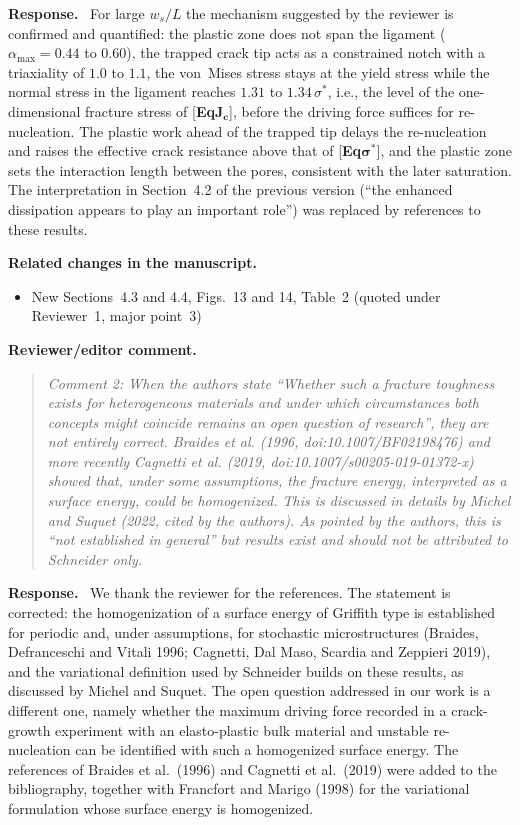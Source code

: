 \documentclass[pdflatex,sn-mathphys-num]{sn-jnl}
\newcommand{\EqJcLabel}{[\textbf{Eq$\boldsymbol{J_c}$}]\xspace}
\newcommand{\EqSigmaStarLabel}{[\textbf{Eq$\boldsymbol{\sigma^*}$}]\xspace}
\newenvironment{reviewercomment}
  {\par\noindent\textbf{Reviewer/editor comment.}\begin{quote}\itshape}
  {\end{quote}}
\newenvironment{response}
  {\par\noindent\textbf{Response.}\ }
  {\par}
\newenvironment{relatedchanges}
  {\par\noindent\textbf{Related changes in the manuscript.}\begin{itemize}\small}
  {\end{itemize}}
\newcommand{\relhead}[1]{\item[]\vspace*{0.2\baselineskip}#1}
\begin{document}
\begin{response}
For large $w_s/L$ the mechanism suggested by the reviewer is confirmed and quantified: the plastic zone does not span the ligament ($\alpha_{\max} = 0.44$ to $0.60$), the trapped crack tip acts as a constrained notch with a triaxiality of $1.0$ to $1.1$, the von~Mises stress stays at the yield stress while the normal stress in the ligament reaches $1.31$ to $1.34\,\sigma^*$, i.e., the level of the one-dimensional fracture stress of \EqJcLabel, before the driving force suffices for re-nucleation. The plastic work ahead of the trapped tip delays the re-nucleation and raises the effective crack resistance above that of \EqSigmaStarLabel, and the plastic zone sets the interaction length between the pores, consistent with the later saturation. The interpretation in Section~4.2 of the previous version (``the enhanced dissipation appears to play an important role'') was replaced by references to these results.
\end{response}

\begin{relatedchanges}
\relhead{New Sections~4.3 and 4.4, Figs.~13 and 14, Table~2 (quoted under Reviewer~1, major point~3)}
\end{relatedchanges}

\begin{reviewercomment}
Comment 2: When the authors state ``Whether such a fracture toughness exists for heterogeneous materials and under which
circumstances both concepts might coincide remains an open question of research'', they are not entirely correct.
Braides et al. (1996, doi:10.1007/BF02198476) and more recently Cagnetti et al. (2019, doi:10.1007/s00205-019-01372-x)
showed that, under some assumptions, the fracture energy, interpreted as a surface energy, could be homogenized. This
is discussed in details by Michel and Suquet (2022, cited by the authors). As pointed by the authors, this is ``not
established in general'' but results exist and should not be attributed to Schneider only.
\end{reviewercomment}

\begin{response}
We thank the reviewer for the references. The statement is corrected: the homogenization of a surface energy of
Griffith type is established for periodic and, under assumptions, for stochastic microstructures (Braides, Defranceschi
and Vitali 1996; Cagnetti, Dal Maso, Scardia and Zeppieri 2019), and the variational definition used by Schneider builds
on these results, as discussed by Michel and Suquet. The open question addressed in our work is a different one, namely
whether the maximum driving force recorded in a crack-growth experiment with an elasto-plastic bulk material and
unstable re-nucleation can be identified with such a homogenized surface energy. The references of Braides et al.\ (1996)
and Cagnetti et al.\ (2019) were added to the bibliography, together with Francfort and Marigo (1998) for the variational
formulation whose surface energy is homogenized.
\end{response}
\end{document}

